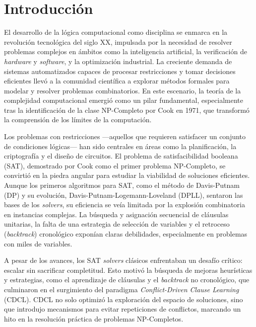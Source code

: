 \chapter*{Introducción}\label{chapter:introduction}
El desarrollo de la lógica computacional como disciplina se enmarca en la revolución tecnológica del siglo XX, impulsada por la necesidad de resolver problemas complejos en ámbitos como la inteligencia artificial, la verificación de \textit{hardware} y \textit{software}, y la optimización industrial. La creciente demanda de sistemas automatizados capaces de procesar restricciones y tomar decisiones eficientes llevó a la comunidad científica a explorar métodos formales para modelar y resolver problemas combinatorios. En este escenario, la teoría de la complejidad computacional emergió como un pilar fundamental, especialmente tras la identificación de la clase NP-Completo por Cook en 1971, que transformó la comprensión de los límites de la computación.

Los problemas con restricciones —aquellos que requieren satisfacer un conjunto de condiciones lógicas— han sido centrales en áreas como la planificación, la criptografía y el diseño de circuitos. El problema de satisfacibilidad booleana (SAT), demostrado por Cook como el primer problema NP-Completo, se convirtió en la piedra angular para estudiar la viabilidad de soluciones eficientes. Aunque los primeros algoritmos para SAT, como el método de Davis-Putnam (DP) y su evolución, Davis-Putnam-Logemann-Loveland (DPLL), sentaron las bases de los \textit{solvers}, su eficiencia se veía limitada por la explosión combinatoria en instancias complejas. La búsqueda y asignaci\'on secuencial de cláusulas unitarias, la falta de una estrategia de selecci\'on de variables y el retroceso (\textit{backtrack}) cronológico exponían claras debilidades, especialmente en problemas con miles de variables.

A pesar de los avances, los SAT \textit{solvers} clásicos enfrentaban un desafío crítico: escalar sin sacrificar completitud. Esto motivó la búsqueda de mejoras heurísticas y estrategias, como el aprendizaje de cláusulas y el \textit{backtrack} no cronológico, que culminaron en el surgimiento del paradigma \textit{Conflict-Driven Clause Learning} (CDCL). CDCL no solo optimizó la exploración del espacio de soluciones, sino que introdujo mecanismos para evitar repeticiones de conflictos, marcando un hito en la resolución práctica de problemas NP-Completos. 

